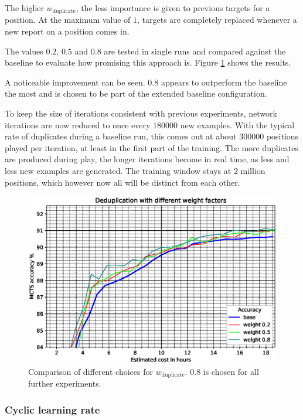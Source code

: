 \documentclass[12pt,onecolumn,oneside,titlepage]{article}
\begin{document}
The higher $w_{\text{duplicate}}$, the less importance is given to previous targets for a position. At the maximum value of $1$,
targets are completely replaced whenever a new report on a position comes in.

The values $0.2$, $0.5$ and $0.8$ are tested in single runs and compared against the baseline to evaluate how promising this approach is. Figure \ref{fig:dedupe_cmp} shows the results. 

A noticeable improvement can be seen. $0.8$ appears to outperform the baseline the most and is chosen to be part of the extended baseline configuration.

To keep the size of iterations consistent with previous experiments, network iterations are now reduced to once every $180000$ new examples. With the typical rate of duplicates during a baseline run, this comes out at about $300000$ positions played per iteration, at least in the first part
of the training. The more duplicates are produced during play, the longer iterations become in real time, as less and less new examples are generated.
The training window stays at $2$ million positions, which however now all will be distinct from each other.

\begin{figure}[H]
\centering
\includegraphics[clip,width=\columnwidth]{dedupe}
\caption{Comparison of different choices for $w_{\text{duplicate}}$. $0.8$ is chosen for all further experiments.}
\label{fig:dedupe_cmp}
\end{figure}


\subsubsection{Cyclic learning rate}
\end{document}
